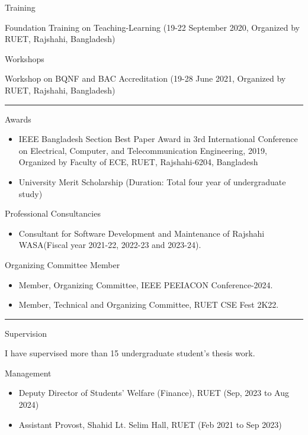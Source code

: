 \documentclass[a4paper,10pt]{article}
\newlength{\cvcolumngapwidth}
\newlength{\cvleftcolumnwidth}
\newlength{\cvrightcolumnwidth}
\newcommand{\cvsectionstyle}[1]{{\normalsize\cvsectionfont\textcolor{cvsectioncolor}{#1}}}
\newcommand{\cvheadingstyle}[1]{{\normalsize\cvheadingfont\textcolor{cvheadingcolor}{#1}}}
\newlength{\cvafteritemskipamount}
\newlength{\cvaftersectionskipamount}
\newlength{\cvbetweensectionandheadingextraskipamount}
\newlength{\cvparskip}
\newcommand{\cvsection}[1]{
    \begin{minipage}[t]{\cvleftcolumnwidth}
        \raggedleft\cvsectionstyle{#1}
    \end{minipage}%
    \hspace{\cvcolumngapwidth}%
    \begin{minipage}[t]{\cvrightcolumnwidth}
        \textcolor{cvrulecolor}{\rule{\cvrightcolumnwidth}{0.3mm}}
    \end{minipage}

    \vspace{\cvaftersectionskipamount}
}
\newcommand{\cvitem}[2]{
    \begin{minipage}[t]{\cvleftcolumnwidth}
        \raggedleft #1
    \end{minipage}%
    \hspace{\cvcolumngapwidth}%
    \begin{minipage}[t]{\cvrightcolumnwidth}
        \setlength{\parskip}{\cvparskip} #2
    \end{minipage}

    \vspace{\cvafteritemskipamount}
}
\begin{document}
\vspace{\cvbetweensectionandheadingextraskipamount}

\cvitem{
    \cvheadingstyle{Training}
}
{
Foundation Training on Teaching-Learning (19-22 September 2020, Organized by RUET, Rajshahi, Bangladesh)

}
\cvitem{
    \cvheadingstyle{Workshops}
}{
Workshop on BQNF and BAC Accreditation (19-28 June 2021, Organized by RUET, Rajshahi, Bangladesh)
}
\cvsection{HONORS \& MEMBERSHIPS}

\vspace{\cvbetweensectionandheadingextraskipamount}


\cvitem{
    \cvheadingstyle{Awards}
}{
    \begin{itemize}
    \item{IEEE Bangladesh Section Best Paper Award in 3rd International Conference on Electrical, Computer, and Telecommunication Engineering, 2019, Organized by Faculty of ECE, RUET, Rajshahi-6204, Bangladesh}
    \item{University Merit Scholarship (Duration: Total four year of undergraduate study)}
    \end{itemize}
}

\cvitem{
    \cvheadingstyle{Professional Consultancies}
}{
    \begin{itemize}
    \item Consultant for Software Development and Maintenance of Rajshahi WASA(Fiscal year 2021-22,
2022-23 and 2023-24).
    \end{itemize}
}

\cvitem{
    \cvheadingstyle{Organizing Committee Member}
}{
 \begin{itemize}
        \item Member, Organizing Committee, IEEE PEEIACON Conference-2024.
        \item Member, Technical and Organizing Committee, RUET CSE Fest 2K22.
\end{itemize}
}

\cvsection{SUPERVISION \& MANAGEMENT}
\cvitem{
    \cvheadingstyle{Supervision}
}{
     I have supervised more than 15 undergraduate student’s thesis work.
}
\cvitem{
    \cvheadingstyle{Management}
}{
\begin{itemize}
    \item Deputy Director of Students’ Welfare (Finance), RUET (Sep, 2023 to Aug 2024)\\
    \item Assistant Provost, Shahid Lt. Selim Hall, RUET (Feb 2021 to Sep 2023)\\
\end{itemize}
    
}
\end{document}
